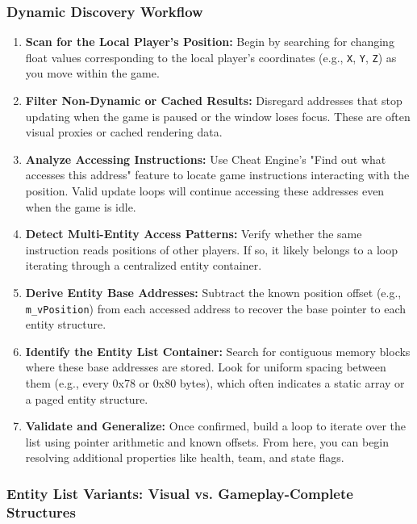 \subsubsection*{Dynamic Discovery Workflow}

\begin{enumerate}
    \item \textbf{Scan for the Local Player’s Position:}  
    Begin by searching for changing float values corresponding to the local player’s coordinates (e.g., \texttt{X}, \texttt{Y}, \texttt{Z}) as you move within the game.

    \item \textbf{Filter Non-Dynamic or Cached Results:}  
    Disregard addresses that stop updating when the game is paused or the window loses focus. These are often visual proxies or cached rendering data.

    \item \textbf{Analyze Accessing Instructions:}  
    Use Cheat Engine’s "Find out what accesses this address" feature to locate game instructions interacting with the position. Valid update loops will continue accessing these addresses even when the game is idle.

    \item \textbf{Detect Multi-Entity Access Patterns:}  
    Verify whether the same instruction reads positions of other players. If so, it likely belongs to a loop iterating through a centralized entity container.

    \item \textbf{Derive Entity Base Addresses:}  
    Subtract the known position offset (e.g., \texttt{m\_vPosition}) from each accessed address to recover the base pointer to each entity structure.

    \item \textbf{Identify the Entity List Container:}  
    Search for contiguous memory blocks where these base addresses are stored. Look for uniform spacing between them (e.g., every 0x78 or 0x80 bytes), which often indicates a static array or a paged entity structure.

    \item \textbf{Validate and Generalize:}  
    Once confirmed, build a loop to iterate over the list using pointer arithmetic and known offsets. From here, you can begin resolving additional properties like health, team, and state flags.
\end{enumerate}

\subsubsection*{Entity List Variants: Visual vs. Gameplay-Complete Structures}

